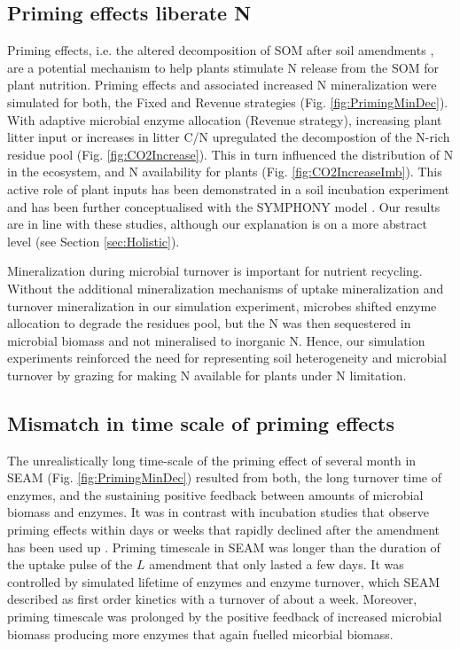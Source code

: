 \subsection{Priming effects liberate N}
Priming effects, i.e. the altered decomposition of SOM after soil amendments
\citep{Kuzyakov00}, are a potential mechanism to help plants stimulate N release
from the SOM for plant nutrition.
Priming effects and associated increased N mineralization were simulated for
both, the Fixed and Revenue strategies (Fig. \ref{fig:PrimingMinDec}). With
adaptive microbial enzyme allocation (Revenue strategy), increasing
plant litter input or increases in litter C/N upregulated
the decompostion of the N-rich residue pool (Fig.
\ref{fig:CO2Increase}).
This in turn influenced the distribution of N in the ecosystem, and N
availability for plants (Fig.
\ref{fig:CO2IncreaseImb}). This active role of plant inputs has been
demonstrated in a soil incubation experiment \citep{Fontaine11} and has been
further conceptualised with the SYMPHONY model \citep{Perveen14}. Our results
are in line with these studies, although our explanation is on a more abstract
level (see Section \ref{sec:Holistic}). 

Mineralization during microbial turnover is important for nutrient recycling.
Without the additional mineralization mechanisms of uptake mineralization
\citep{Manzoni08} and turnover mineralization \citep{Clarholm85, Raynaud06} in
our simulation experiment, microbes shifted enzyme allocation to degrade the
residues pool, but the N was then sequestered in microbial biomass and not
mineralised to inorganic N. Hence, our simulation experiments reinforced the
need for representing soil heterogeneity and microbial turnover by grazing
for making N available for plants under N limitation.

\subsection{Mismatch in time scale of priming effects}
The unrealistically long time-scale of the priming effect of several month in
SEAM (Fig. \ref{fig:PrimingMinDec}) resulted from both, the long turnover time of
enzymes, and the sustaining positive feedback between amounts of microbial
biomass and enzymes. It was in contrast with incubation studies that observe
priming effects within days or weeks that rapidly declined after the amendment
has been used up \citep{Blagodatskaya14}.
Priming timescale in SEAM was longer than the duration of the uptake pulse of
the $L$ amendment that only lasted a few days. It was controlled by simulated
lifetime of enzymes and enzyme turnover, which SEAM described as first order
kinetics with a turnover of about a week. Moreover, priming timescale was
prolonged by the positive feedback of increased microbial biomass producing more
enzymes that again fuelled micorbial biomass. 

